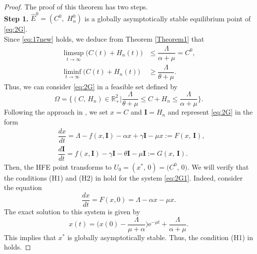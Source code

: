 \documentclass[11pt]{article}
\theoremstyle{definition}
\theoremstyle{remark}
\numberwithin{equation}{section}
\begin{document}
\begin{proof}
The proof of this theorem has two steps.\\
\textbf{Step 1.} $\widehat{E}^0 = (C^0,\,\,H_n^0)$ is a globally asymptotically stable equilibrium point of \eqref{eq:2G}.\\
Since \eqref{eq:17new} holds, we deduce from Theorem \ref{Theorem1} that
\begin{equation*}
\begin{split}
  \limsup_{t \to \infty}\big(C(t) + H_n(t)\big) &\le \dfrac{\Lambda}{\alpha + \mu} = C^0,\\
  \liminf_{t \to \infty}\big(C(t) + H_n(t)\big) &\ge \dfrac{\Lambda}{\theta + \mu}.
\end{split}
\end{equation*}
Thus, we can consider \eqref{eq:2G} in a feasible set defined by
\begin{equation}\label{eq:Pset}
\Omega = \bigg\{(C,\,H_n) \in \mathbb{R}_+^2\bigg|\dfrac{\Lambda}{\theta + \mu} \le C + H_n \le \dfrac{\Lambda}{\alpha + \mu}\bigg\}.
\end{equation}
Following the approach in \cite{Castillo-Chavez}, we set $x = C$ and $\textbf{I} = H_n$ and represent \eqref{eq:2G} in the form
\begin{equation}\label{eq:2G1}
\begin{split}
& \dfrac{dx}{dt} = \Lambda - f(x, \textbf{I}) -\alpha x + \gamma \textbf{I} -\mu x := F(x,\,\textbf{I}), \\
& \dfrac{d\textbf{I}}{dt} = f(x, \textbf{I}) - \gamma \textbf{I} - \theta \textbf{I} - \mu \textbf{I} := G(x,\,\textbf{I}).
\end{split}
\end{equation}
Then, the HFE point transforms to $U_0 = (x^*,\,0) = \big(C^0,\,0\big)$.
We will verify that the conditions (H1) and (H2) in \cite{Castillo-Chavez} hold for the system \eqref{eq:2G1}.
 Indeed, consider the equation
\begin{equation*}
\dfrac{dx}{dt} = F(x, 0) = \Lambda - \alpha x - \mu x.
\end{equation*}
The exact solution to this system is given by
\begin{equation*}
x(t) = \bigg(x(0) - \dfrac{\Lambda}{\mu + \alpha}\bigg)\mathrm{e}^{-\mu t} + \dfrac{\Lambda}{\alpha + \mu}.
\end{equation*}
This implies that $x^*$ is globally asymptotically stable. Thus, the condition (H1) in \cite{Castillo-Chavez} holds.


\end{proof}
\end{document}
